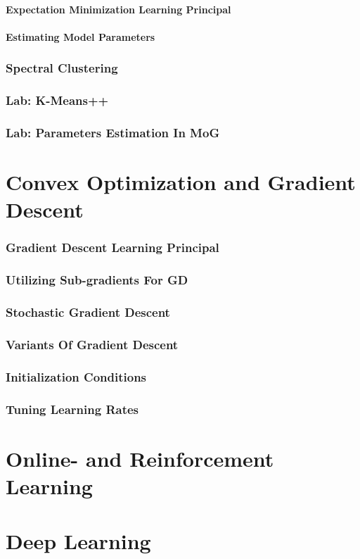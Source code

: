 \documentclass[11pt,fleqn]{book} %
\begin{document}
            \subsubsection{Expectation Minimization Learning Principal}
            \subsubsection{Estimating Model Parameters}
        \subsection{Spectral Clustering}
        \subsection{Lab: K-Means++}
        \subsection{Lab: Parameters Estimation In MoG}
    
\chapter{Convex Optimization and Gradient Descent}
    \subsection{Gradient Descent Learning Principal}
    \subsection{Utilizing Sub-gradients For GD}
    \subsection{Stochastic Gradient Descent}
    \subsection{Variants Of Gradient Descent}
        \subsection{Initialization Conditions}
        \subsection{Tuning Learning Rates}

\chapter{Online- and Reinforcement Learning}
\chapter{Deep Learning}

\newpage
\end{document}
